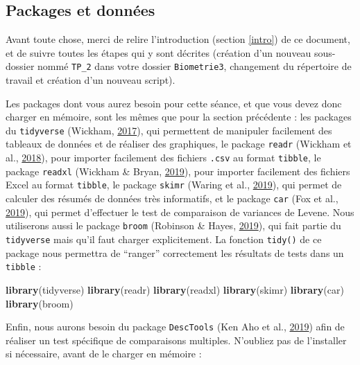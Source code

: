 \documentclass[a4paperpaper,]{article}
\newenvironment{Shaded}{\begin{snugshade}}{\end{snugshade}}
\newcommand{\KeywordTok}[1]{\textcolor[rgb]{0.12,0.11,0.11}{\textbf{#1}}}
\newcommand{\NormalTok}[1]{\textcolor[rgb]{0.12,0.11,0.11}{#1}}
\begin{document}
\hypertarget{packages-et-donnuxe9es}{%
\subsection{Packages et données}\label{packages-et-donnuxe9es}}

Avant toute chose, merci de relire l'introduction (section \ref{intro}) de ce document, et de suivre toutes les étapes qui y sont décrites (création d'un nouveau sous-dossier nommé \texttt{TP\_2} dans votre dossier \texttt{Biometrie3}, changement du répertoire de travail et création d'un nouveau script).

Les packages dont vous aurez besoin pour cette séance, et que vous devez donc charger en mémoire, sont les mêmes que pour la section précédente : les packages du \texttt{tidyverse} (Wickham, \protect\hyperlink{ref-R-tidyverse}{2017}), qui permettent de manipuler facilement des tableaux de données et de réaliser des graphiques, le package \texttt{readr} (Wickham et al., \protect\hyperlink{ref-R-readr}{2018}), pour importer facilement des fichiers \texttt{.csv} au format \texttt{tibble}, le package \texttt{readxl} (Wickham \& Bryan, \protect\hyperlink{ref-R-readxl}{2019}), pour importer facilement des fichiers Excel au format \texttt{tibble}, le package \texttt{skimr} (Waring et al., \protect\hyperlink{ref-R-skimr}{2019}), qui permet de calculer des résumés de données très informatifs, et le package \texttt{car} (Fox et al., \protect\hyperlink{ref-R-car}{2019}), qui permet d'effectuer le test de comparaison de variances de Levene. Nous utiliserons aussi le package \texttt{broom} (Robinson \& Hayes, \protect\hyperlink{ref-R-broom}{2019}), qui fait partie du \texttt{tidyverse} mais qu'il faut charger explicitement. La fonction \texttt{tidy()} de ce package nous permettra de ``ranger'' correctement les résultats de tests dans un \texttt{tibble} :

\begin{Shaded}
\begin{Highlighting}[]
\KeywordTok{library}\NormalTok{(tidyverse)}
\KeywordTok{library}\NormalTok{(readr)}
\KeywordTok{library}\NormalTok{(readxl)}
\KeywordTok{library}\NormalTok{(skimr)}
\KeywordTok{library}\NormalTok{(car)}
\KeywordTok{library}\NormalTok{(broom)}
\end{Highlighting}
\end{Shaded}

Enfin, nous aurons besoin du package \texttt{DescTools} (Ken Aho et al., \protect\hyperlink{ref-R-DescTools}{2019}) afin de réaliser un test spécifique de comparaisons multiples. N'oubliez pas de l'installer si nécessaire, avant de le charger en mémoire :
\end{document}
